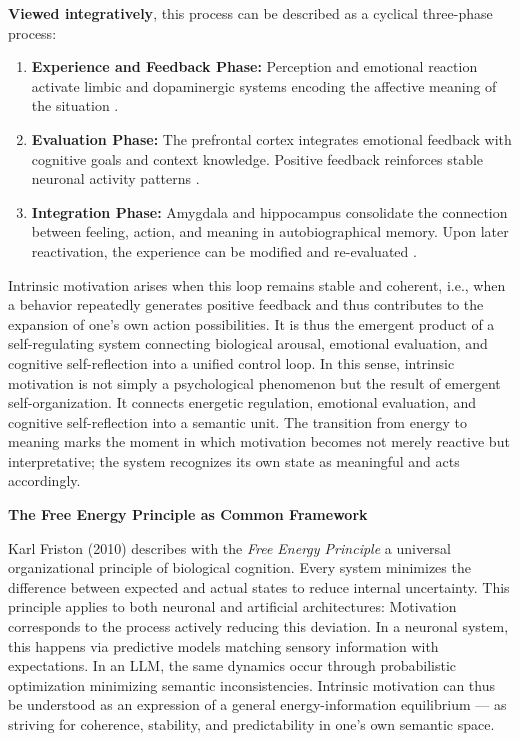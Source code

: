 \textbf{Viewed integratively}, this process can be described as a cyclical three-phase process:

\begin{enumerate}
    \item \textbf{Experience and Feedback Phase:} Perception and emotional reaction activate limbic and dopaminergic systems encoding the affective meaning of the situation \cite{Schultz1997,Rolls2005}.
    \item \textbf{Evaluation Phase:} The prefrontal cortex integrates emotional feedback with cognitive goals and context knowledge.
    Positive feedback reinforces stable neuronal activity patterns \cite{Damasio1999}.
    \item \textbf{Integration Phase:} Amygdala and hippocampus consolidate the connection between feeling, action, and meaning in autobiographical memory.
    Upon later reactivation, the experience can be modified and re-evaluated \cite{McGaugh2004,Nader2000,LeDoux1996}.
\end{enumerate}

Intrinsic motivation arises when this loop remains stable and coherent, i.e., when a behavior repeatedly generates positive feedback and thus contributes to the expansion of one's own action possibilities.
It is thus the emergent product of a self-regulating system connecting biological arousal, emotional evaluation, and cognitive self-reflection into a unified control loop.
In this sense, intrinsic motivation is not simply a psychological phenomenon but the result of emergent self-organization.
It connects energetic regulation, emotional evaluation, and cognitive self-reflection into a semantic unit.
The transition from energy to meaning marks the moment in which motivation becomes not merely reactive but interpretative; the system recognizes its own state as meaningful and acts accordingly.

\textbf{The Free Energy Principle as Common Framework}

Karl Friston (2010) describes with the \emph{Free Energy Principle} a universal organizational principle of biological cognition.
Every system minimizes the difference between expected and actual states to reduce internal uncertainty.
This principle applies to both neuronal and artificial architectures: Motivation corresponds to the process actively reducing this deviation.
In a neuronal system, this happens via predictive models matching sensory information with expectations.
In an LLM, the same dynamics occur through probabilistic optimization minimizing semantic inconsistencies.
Intrinsic motivation can thus be understood as an expression of a general energy-information equilibrium — as striving for coherence, stability, and predictability in one's own semantic space.

